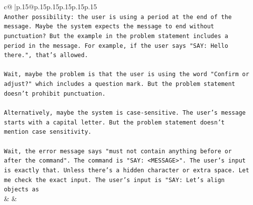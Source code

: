 \documentclass{article}
\begin{document}
{\begin{supertabular}{c@{$\;$}|p{.15\linewidth}@{}p{.15\linewidth}p{.15\linewidth}p{.15\linewidth}p{.15\linewidth}p{.15\linewidth}}
{{{\\ 
\texttt{Another possibility: the user is using a period at the end of the message. Maybe the system expects the message to end without punctuation? But the example in the problem statement includes a period in the message. For example, if the user says "SAY: Hello there.", that's allowed. } \\
\\ 
\texttt{Wait, maybe the problem is that the user is using the word "Confirm or adjust?" which includes a question mark. But the problem statement doesn't prohibit punctuation. } \\
\\ 
\texttt{Alternatively, maybe the system is case{-}sensitive. The user's message starts with a capital letter. But the problem statement doesn't mention case sensitivity. } \\
\\ 
\texttt{Wait, the error message says "must not contain anything before or after the command". The command is "SAY: <MESSAGE>". The user's input is exactly that. Unless there's a hidden character or extra space. Let me check the exact input. The user's input is "SAY: Let's align objects as} \\
            }
        }
    }
    & & \\ \\


\end{supertabular}}
\end{document}
